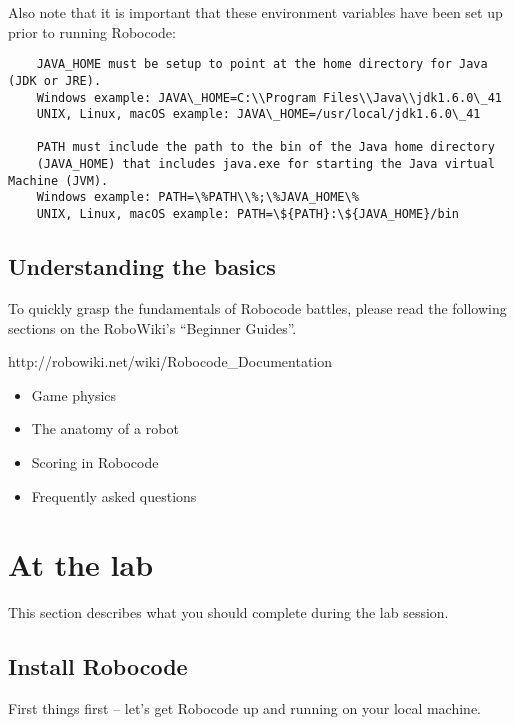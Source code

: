\documentclass{scrreprt}
\begin{document}
Also note that it is important that these environment variables have been set up prior to running Robocode:

\begin{verbatim}
    JAVA_HOME must be setup to point at the home directory for Java (JDK or JRE).
    Windows example: JAVA\_HOME=C:\\Program Files\\Java\\jdk1.6.0\_41
    UNIX, Linux, macOS example: JAVA\_HOME=/usr/local/jdk1.6.0\_41

    PATH must include the path to the bin of the Java home directory
    (JAVA_HOME) that includes java.exe for starting the Java virtual Machine (JVM).
    Windows example: PATH=\%PATH\\%;\%JAVA_HOME\%
    UNIX, Linux, macOS example: PATH=\${PATH}:\${JAVA_HOME}/bin
\end{verbatim}

\section{Understanding the basics}
To quickly grasp the fundamentals of Robocode battles, please read the following sections on the RoboWiki's ``Beginner Guides''. 

http://robowiki.net/wiki/Robocode\_Documentation
\begin{itemize}
\item Game physics
\item The anatomy of a robot
\item Scoring in Robocode
\item Frequently asked questions
\end{itemize}

\chapter{At the lab}
This section describes what you should complete during the lab session.

\section{Install Robocode} \label{sec:install}
First things first -- let's get Robocode up and running on your local machine.
\end{document}

